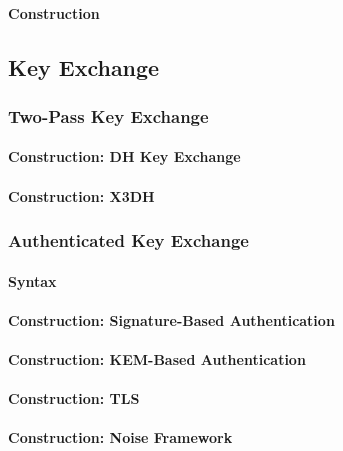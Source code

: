 \documentclass[a4paper,orivec]{llncs}
\begin{document}
\paragraph{Construction}


\subsection{Key Exchange}

\subsubsection{Two-Pass Key Exchange}


\paragraph{Construction: DH Key Exchange}

\paragraph{Construction: X3DH}

\subsubsection{Authenticated Key Exchange}

\paragraph{Syntax}

\paragraph{Construction: Signature-Based Authentication}

\paragraph{Construction: KEM-Based Authentication}

\paragraph{Construction: TLS}

\paragraph{Construction: Noise Framework}
\end{document}

